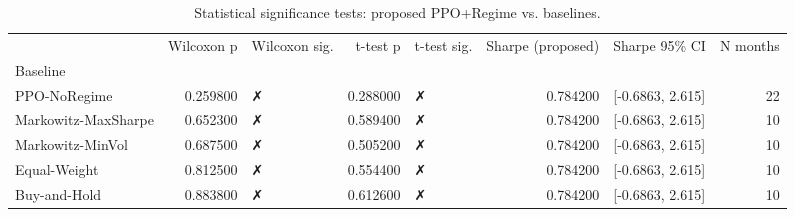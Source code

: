 \begin{table}
\caption{Statistical significance tests: proposed PPO+Regime vs. baselines.}
\label{tab:significance}
\begin{tabular}{lrlrlrlr}
\toprule
 & Wilcoxon p & Wilcoxon sig. & t-test p & t-test sig. & Sharpe (proposed) & Sharpe 95\% CI & N months \\
Baseline &  &  &  &  &  &  &  \\
\midrule
PPO-NoRegime & 0.259800 & ✗ & 0.288000 & ✗ & 0.784200 & [-0.6863, 2.615] & 22 \\
Markowitz-MaxSharpe & 0.652300 & ✗ & 0.589400 & ✗ & 0.784200 & [-0.6863, 2.615] & 10 \\
Markowitz-MinVol & 0.687500 & ✗ & 0.505200 & ✗ & 0.784200 & [-0.6863, 2.615] & 10 \\
Equal-Weight & 0.812500 & ✗ & 0.554400 & ✗ & 0.784200 & [-0.6863, 2.615] & 10 \\
Buy-and-Hold & 0.883800 & ✗ & 0.612600 & ✗ & 0.784200 & [-0.6863, 2.615] & 10 \\
\bottomrule
\end{tabular}
\end{table}
